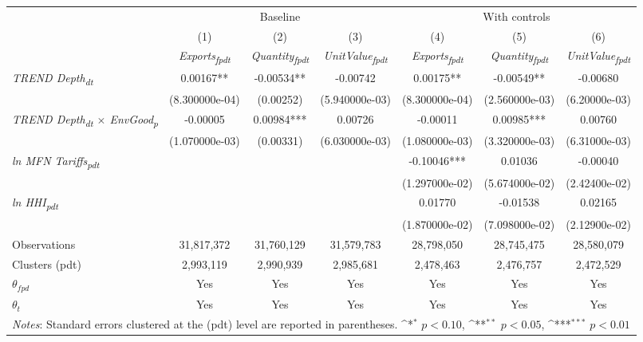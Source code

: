 {
\def\sym#1{\ifmmode^{#1}\else\(^{#1}\)\fi}
\begin{tabular}{l*{6}{c}}
\toprule
                &\multicolumn{3}{c}{Baseline}                            &\multicolumn{3}{c}{With controls}                       \\\cmidrule(lr){2-4}\cmidrule(lr){5-7}
                &\multicolumn{1}{c}{(1)}&\multicolumn{1}{c}{(2)}&\multicolumn{1}{c}{(3)}&\multicolumn{1}{c}{(4)}&\multicolumn{1}{c}{(5)}&\multicolumn{1}{c}{(6)}\\
                &\multicolumn{1}{c}{\textit{Exports\textsubscript{fpdt}}}&\multicolumn{1}{c}{\textit{Quantity\textsubscript{fpdt}}}&\multicolumn{1}{c}{\textit{UnitValue\textsubscript{fpdt}}}&\multicolumn{1}{c}{\textit{Exports\textsubscript{fpdt}}}&\multicolumn{1}{c}{\textit{Quantity\textsubscript{fpdt}}}&\multicolumn{1}{c}{\textit{UnitValue\textsubscript{fpdt}}}\\
\midrule
\textit{TREND Depth\textsubscript{dt}} & 0.00167** & -0.00534** & -0.00742 & 0.00175** & -0.00549** & -0.00680\\
 & (8.300000e-04) & (0.00252) & (5.940000e-03) & (8.300000e-04) & (2.560000e-03) & (6.20000e-03)\\
\addlinespace
\textit{TREND Depth\textsubscript{dt} $\times$ EnvGood\textsubscript{p}} & -0.00005 & 0.00984*** & 0.00726 & -0.00011 & 0.00985*** & 0.00760\\
 & (1.070000e-03) & (0.00331) & (6.030000e-03) & (1.080000e-03) & (3.320000e-03) & (6.31000e-03)\\
\addlinespace
\textit{ln MFN Tariffs\textsubscript{pdt}} &  &  &  & -0.10046*** & 0.01036 & -0.00040\\
 &  &  &  & (1.297000e-02) & (5.674000e-02) & (2.42400e-02)\\
\addlinespace
\textit{ln HHI\textsubscript{pdt}} &  &  &  & 0.01770 & -0.01538 & 0.02165\\
 &  &  &  & (1.870000e-02) & (7.098000e-02) & (2.12900e-02)\\
\addlinespace
\midrule
\midrule
Observations & 31,817,372 & 31,760,129 & 31,579,783 & 28,798,050 & 28,745,475 & 28,580,079\\
Clusters (pdt) & 2,993,119 & 2,990,939 & 2,985,681 & 2,478,463 & 2,476,757 & 2,472,529\\
$\theta_{fpd}$ & Yes & Yes & Yes & Yes & Yes & Yes\\
$\theta_t$ & Yes & Yes & Yes & Yes & Yes & Yes\\
\bottomrule
\multicolumn{7}{l}{\footnotesize \textit{Notes}: Standard errors clustered at the (pdt) level are reported in parentheses. \sym{*} \(p<0.10\), \sym{**} \(p<0.05\), \sym{***} \(p<0.01\)}\\
\end{tabular}
}
